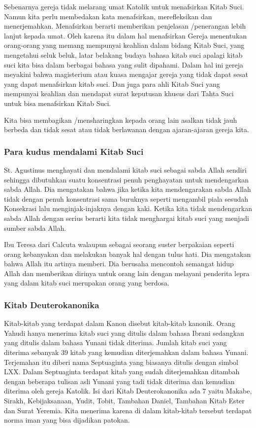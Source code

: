 Sebenarnya gereja tidak melarang umat Katolik untuk menafsirkan Kitab Suci. Namun kita perlu membedakan kata menafsirkan, merefleksikan dan menerjemahkan. Menafsirkan berarti memberikan penjelasan /penerangan lebih lanjut kepada umat. Oleh karena itu dalam hal menafsirkan Gereja menentukan orang-orang yang memang mempunyai keahlian dalam bidang Kitab Suci, yang mengetahui seluk beluk, latar belakang budaya bahasa kitab suci apalagi kitab suci kita bisa dalam berbagai bahasa yang sulit dipahami. Dalam hal ini gereja meyakini bahwa magisterium atau kuasa mengajar gereja yang tidak dapat sesat yang dapat menafsirkan kitab suci. Dan juga para ahli Kitab Suci yang mempunyai keahlian dan mendapat surat keputusan khusus dari Tahta Suci untuk bisa menafsirkan Kitab Suci.

Kita bisa membagikan /mensharingkan kepada orang lain asalkan tidak jauh berbeda dan tidak sesat atau tidak berlawanan dengan ajaran-ajaran gereja kita.

\subsubsection*{Para kudus mendalami Kitab Suci}
St. Agustinus menghayati dan mendalami kitab suci sebagai sabda Allah sendiri sehingga dibutuhkan suatu konsentrasi penuh penghayatan untuk mendengarkan sabda Allah. Dia mengatakan bahwa jika ketika kita mendengarakan sabda Allah tidak dengan penuh konsentrasi sama buruknya seperti mengambil piala sesudah Konsekrasi lalu menginjak-injaknya dengan kaki. Ketika kita tidak mendengarkan sabda Allah dengan serius berarti kita tidak menghargai kitab suci yang menjadi sumber sabda Allah.

Ibu Teresa dari Calcuta walaupun sebagai seorang suster berpakaian seperti orang kebanyakan dan melakukan banyak hal dengan tulus hati. Dia mengatakan bahwa Allah itu artinya memberi. Dia berusaha mencontoh semangat hidup Allah dan memberikan dirinya untuk orang lain dengan melayani penderita lepra yang dalam kitab suci merupakan orang yang berdosa.

\subsubsection*{Kitab Deuterokanonika}
Kitab-kitab yang terdapat dalam Kanon disebut kitab-kitab kanonik. Orang Yahudi hanya menerima kitab suci yang ditulis dalam bahasa Ibrani sedangkan yang ditulis dalam bahasa Yunani tidak diterima. Jumlah kitab suci yang diterima sebanyak 39 kitab yang kemudian diterjemahkan dalam bahasa Yunani. Terjemahan itu diberi nama Septuaginta yang biasanya ditulis dengan simbol LXX. Dalam Septuaginta terdapat kitab yang sudah diterjemahkan ditambah dengan beberapa tulisan asli Yunani yang tadi tidak diterima dan kemudian diterima oleh gereja Katolik. Isi dari Kitab Deuterokanonika ada 7 yaitu Makabe, Sirakh, Kebijaksanaan, Yudit, Tobit, Tambahan Daniel, Tambahan Kitab Ester dan Surat Yeremia. Kita menerima karena di dalam kitab-kitab tersebut terdapat norma iman yang bisa dijadikan patokan.   


